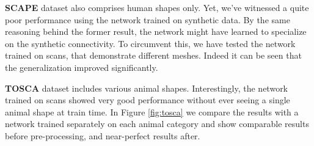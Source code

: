 \documentclass[10pt,twocolumn,letterpaper]{article}
\begin{document}
\vspace{1ex}\noindent\textbf{SCAPE} dataset \cite{scape} also comprises human shapes only. Yet, we've witnessed a quite poor performance using the network trained on synthetic data. By the same reasoning behind the former result, the network might have learned to specialize on the synthetic connectivity. To circumvent this, we have tested the network trained on scans, that demonstrate different meshes. Indeed it can be seen that the generalization improved significantly. 

\vspace{1ex}\noindent\textbf{TOSCA} dataset \cite{bronstein2008numerical} includes various animal shapes. Interestingly, the network trained on scans showed very good performance without ever seeing a single animal shape at train time. In Figure \ref{fig:tosca} we compare the results with a network trained separately on each animal category  and show comparable results before pre-processing, and near-perfect results after. 
\end{document}
